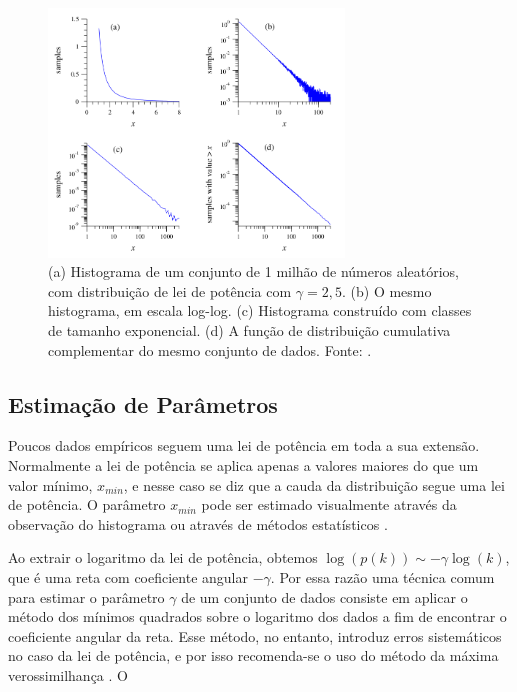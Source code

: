 \documentclass{article}
\begin{document}
\begin{figure} \label{fig:histogramas}
\centering
\includegraphics[width=0.7\textwidth]{histogramas}
\caption{(a) Histograma de um conjunto de 1 milhão de números aleatórios, com distribuição de lei de potência com $\gamma = 2,5$. (b) O mesmo histograma, em escala log-log. (c) Histograma construído com classes de tamanho exponencial. (d) A função de distribuição cumulativa complementar do mesmo conjunto de dados. Fonte: \cite{Newman2005}.}
\end{figure}


\subsection{Estimação de Parâmetros}

Poucos dados empíricos seguem uma lei de potência em toda a sua extensão. Normalmente a lei de potência se aplica apenas a valores maiores do que um valor mínimo, $x_{min}$, e nesse caso se diz que a cauda da distribuição segue uma lei de potência. O parâmetro $x_{min}$ pode ser estimado visualmente através da observação do histograma ou através de métodos estatísticos \cite{Clauset2007}.

Ao extrair o logaritmo da lei de potência, obtemos $\log(p(k)) \sim -\gamma \log(k)$, que é uma reta com coeficiente angular $-\gamma$. Por essa razão uma técnica comum para estimar o parâmetro $\gamma$ de um conjunto de dados consiste em aplicar o método dos mínimos quadrados sobre o logaritmo dos dados a fim de encontrar o coeficiente angular da reta. Esse método, no entanto, introduz erros sistemáticos no caso da lei de potência, e por isso recomenda-se o uso do método da máxima verossimilhança \cite{Clauset2007}. O 
\end{document}
